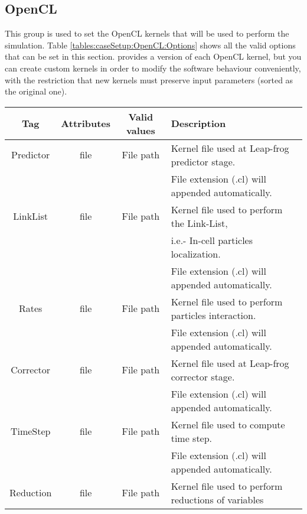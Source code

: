 \subsection{OpenCL}
\label{sss:XML:OpenCL}
%
This group is used to set the OpenCL kernels that will be used to perform the
simulation. Table \ref{tables:caseSetup:OpenCL:Options} shows all the valid
options that can be set in this section.\rc
%
\NAME provides a version of each OpenCL kernel, but you can create custom
kernels in order to modify the software behaviour conveniently, with the
restriction that new kernels must preserve input parameters (sorted as the
original one).
%
\begin{table}[h!b!p!]\small
	\centering
	\begin{tabular}{| c | c | c | l | }
		\hline
		\cellcolor[rgb]{0.7,0.7,0.7}Tag & \cellcolor[rgb]{0.7,0.7,0.7}Attributes & \cellcolor[rgb]{0.7,0.7,0.7}Valid values & \cellcolor[rgb]{0.7,0.7,0.7}Description \\
		\hline
		Predictor & file & File path & Kernel file used at Leap-frog predictor stage. \\
		          &      &           & File extension (.cl) will appended automatically. \\
		\hline
		LinkList          & file & File path & Kernel file used to perform the Link-List, \\
		                  &      &           & i.e.- In-cell particles localization. \\
		                  &      &           & File extension (.cl) will appended automatically. \\
		\hline
		Rates             & file & File path & Kernel file used to perform particles interaction. \\
		                  &      &           & File extension (.cl) will appended automatically. \\
		\hline
		Corrector         & file & File path & Kernel file used at Leap-frog corrector stage. \\
		                  &      &           & File extension (.cl) will appended automatically. \\
		\hline
		TimeStep          & file & File path & Kernel file used to compute time step. \\
		                  &      &           & File extension (.cl) will appended automatically. \\
		\hline
		Reduction         & file & File path & Kernel file used to perform 
		reductions of variables \\

\end{tabular}
\end{table}
